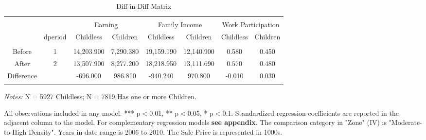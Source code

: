 \documentclass[a4paper]{article}
\begin{document}
\begin{table}[!htbp] 
\begin{adjustwidth}{-0cm}{-0cm}
\begin{threeparttable}
\small
\captionsetup{font=small, justification=raggedright,singlelinecheck=false}
  \caption{Diff-in-Diff Matrix} 
  \label{} 
\begin{tabular}{@{\extracolsep{8pt}}lccccccc} 
\\[-5.8ex]\hline 
\hline \\[-1.8ex]
\multicolumn{2}{c}{}  & \multicolumn{2}{c}{Earning}  & \multicolumn{2}{c}{Family Income} & \multicolumn{2}{c}{Work Participation} \\ 
\multicolumn{1}{c}{} & \multicolumn{1}{c}{dperiod} & \multicolumn{1}{c}{Childless} & \multicolumn{1}{c}{Children} & \multicolumn{1}{c}{Childless} & \multicolumn{1}{c}{Children} & \multicolumn{1}{c}{Childless} & \multicolumn{1}{c}{Children} \\ 
\hline \\[-1.8ex] 
\multicolumn{1}{c}{Before} & 1 & 14,203.900 & 7,290.380 & 19,159.190 & 12,140.900 & 0.580 & 0.450 \\ 
\multicolumn{1}{c}{After} & 2 & 13,507.900 & 8,277.200 & 18,218.950 & 13,111.690 & 0.570 & 0.480 \\ 
\multicolumn{1}{c}{Difference} &  & -696.000 & 986.810 & -940.240 & 970.800 & -0.010 & 0.030 \\ 
\hline \\[-3.6ex] 
\end{tabular} 
\begin{tablenotes}
      \small
      \item\textit{Notes:} N = 5927 Childless; N = 7819 Has one or more Children.
    \end{tablenotes}
\end{threeparttable}
\end{adjustwidth}
\end{table}


All observations included in any model. *** p$<$0.01, ** p$<$0.05, * p$<$0.1. Standardized regression coefficients are reported in the adjacent column to the model. For complementary regression models \textbf{see appendix}. The comparison category in "Zone" (IV) is "Moderate-to-High Density". Years in date range is 2006 to 2010. The Sale Price is represented in 1000s. 
\end{document}
